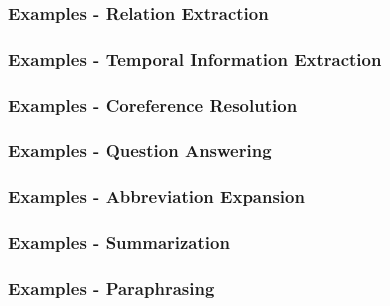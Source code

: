 \documentclass[11pt]{article}
\begin{document}
\subsubsection{Examples - Relation Extraction}
\begin{tcolorbox}
\small

\end{tcolorbox}

\vfill\eject

\subsubsection{Examples - Temporal Information Extraction}
\begin{tcolorbox}
\small

\end{tcolorbox}

\subsubsection{Examples - Coreference Resolution}
\begin{tcolorbox}
\small

\end{tcolorbox}


\subsubsection{Examples - Question Answering}
\begin{tcolorbox}
\small

\end{tcolorbox}

\subsubsection{Examples - Abbreviation Expansion}
\begin{tcolorbox}
\small

\end{tcolorbox}

\vfill\eject

\subsubsection{Examples - Summarization}
\begin{tcolorbox}
\small

\end{tcolorbox}


\subsubsection{Examples - Paraphrasing}
\begin{tcolorbox}
\small

\end{tcolorbox}
\end{document}
